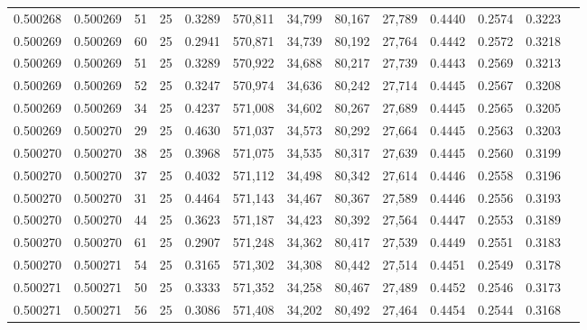 \begin{tabular}{rrrrrrrrrrrrr}
0.500268 & 0.500269 &    51 &  25 &                                     0.3289 & 570,811 &  34,799 &  80,167 &  27,789 & 0.4440 & 0.2574 & 0.3223 \\
0.500269 & 0.500269 &    60 &  25 &                                     0.2941 & 570,871 &  34,739 &  80,192 &  27,764 & 0.4442 & 0.2572 & 0.3218 \\
0.500269 & 0.500269 &    51 &  25 &                                     0.3289 & 570,922 &  34,688 &  80,217 &  27,739 & 0.4443 & 0.2569 & 0.3213 \\
0.500269 & 0.500269 &    52 &  25 &                                     0.3247 & 570,974 &  34,636 &  80,242 &  27,714 & 0.4445 & 0.2567 & 0.3208 \\
0.500269 & 0.500269 &    34 &  25 &                                     0.4237 & 571,008 &  34,602 &  80,267 &  27,689 & 0.4445 & 0.2565 & 0.3205 \\
0.500269 & 0.500270 &    29 &  25 &                                     0.4630 & 571,037 &  34,573 &  80,292 &  27,664 & 0.4445 & 0.2563 & 0.3203 \\
0.500270 & 0.500270 &    38 &  25 &                                     0.3968 & 571,075 &  34,535 &  80,317 &  27,639 & 0.4445 & 0.2560 & 0.3199 \\
0.500270 & 0.500270 &    37 &  25 &                                     0.4032 & 571,112 &  34,498 &  80,342 &  27,614 & 0.4446 & 0.2558 & 0.3196 \\
0.500270 & 0.500270 &    31 &  25 &                                     0.4464 & 571,143 &  34,467 &  80,367 &  27,589 & 0.4446 & 0.2556 & 0.3193 \\
0.500270 & 0.500270 &    44 &  25 &                                     0.3623 & 571,187 &  34,423 &  80,392 &  27,564 & 0.4447 & 0.2553 & 0.3189 \\
0.500270 & 0.500270 &    61 &  25 &                                     0.2907 & 571,248 &  34,362 &  80,417 &  27,539 & 0.4449 & 0.2551 & 0.3183 \\
0.500270 & 0.500271 &    54 &  25 &                                     0.3165 & 571,302 &  34,308 &  80,442 &  27,514 & 0.4451 & 0.2549 & 0.3178 \\
0.500271 & 0.500271 &    50 &  25 &                                     0.3333 & 571,352 &  34,258 &  80,467 &  27,489 & 0.4452 & 0.2546 & 0.3173 \\
0.500271 & 0.500271 &    56 &  25 &                                     0.3086 & 571,408 &  34,202 &  80,492 &  27,464 & 0.4454 & 0.2544 & 0.3168 \\

\end{tabular}
